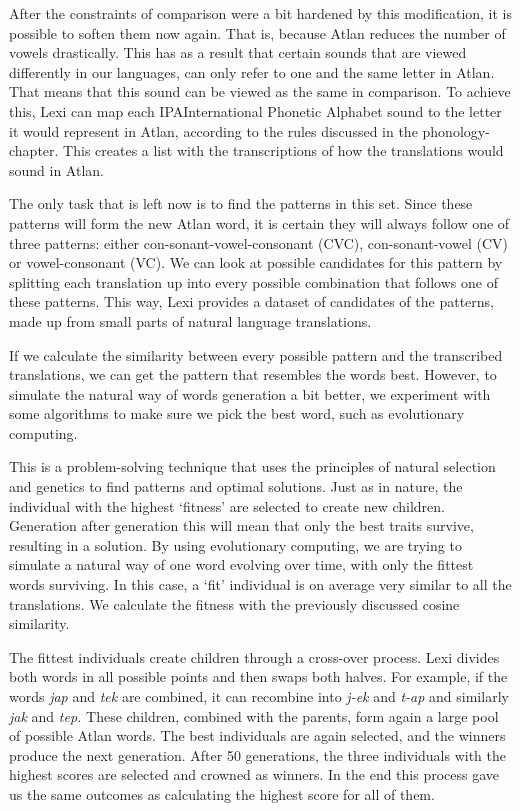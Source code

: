 After the constraints of comparison were a bit hardened by this modification, it is possible to soften them now again. That is, because Atlan reduces the number of vowels drastically. This has as a result that certain sounds that are viewed differently in our languages, can only refer to one and the same letter in Atlan. That means that this sound can be viewed as the same in comparison. To achieve this, Lexi can map each IPA{International Phonetic Alphabet} sound to the letter it would represent in Atlan, according to the rules discussed in the phonology-chapter. This creates a list with the transcriptions of how the translations would sound in Atlan.  

The only task that is left now is to find the patterns in this set. Since these patterns will form the new Atlan word, it is certain they will always follow one of three patterns: either con-sonant-vowel-consonant (CVC), con-sonant-vowel (CV) or vowel-consonant (VC). We can look at possible candidates for this pattern by splitting each translation up into every possible combination that follows one of these patterns. This way, Lexi provides a dataset of candidates of the patterns, made up from small parts of natural language translations. 

If we calculate the similarity between every possible pattern and the transcribed translations, we can get the pattern that resembles the words best. However, to simulate the natural way of words generation a bit better, we experiment with some algorithms to make sure we pick the best word, such as evolutionary computing. 

This is a problem-solving technique that uses the principles of natural selection and genetics to find patterns and optimal solutions. Just as in nature, the individual with the highest ‘fitness’ are selected to create new children. Generation after generation this will mean that only the best traits survive, resulting in a solution. By using evolutionary computing, we are trying to simulate a natural way of one word evolving over time, with only the fittest words surviving. In this case, a ‘fit’ individual is on average very similar to all the translations. We calculate the fitness with the previously discussed cosine similarity. 

The fittest individuals create children through a cross-over process. Lexi divides both words in all possible points and then swaps both halves.  For example, if the words \textit{jap} and \textit{tek} are combined, it can recombine into \textit{j-ek} and \textit{t-ap} and similarly \textit{jak} and \textit{tep.} These children, combined with the parents, form again a large pool of possible Atlan words. The best individuals are again selected, and the winners produce the next generation. After 50 generations, the three individuals with the highest scores are selected and crowned as winners. In the end this process gave us the same outcomes as calculating the highest score for all of them. 

